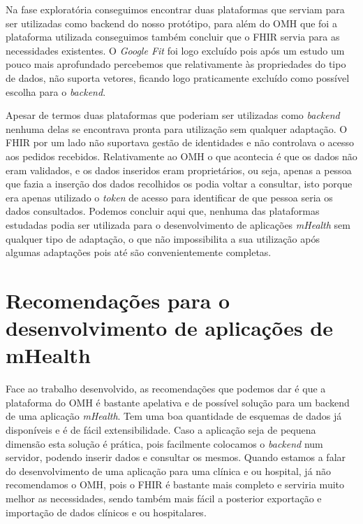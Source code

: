 Na fase exploratória conseguimos encontrar duas plataformas que serviam para ser utilizadas como backend do nosso protótipo, para além do \gls{OMH} que foi a plataforma utilizada conseguimos também concluir que o \gls{FHIR} servia para as necessidades existentes. O \textit{Google Fit} foi logo excluído pois após um estudo um pouco mais aprofundado percebemos que relativamente às propriedades do tipo de dados, não suporta vetores, ficando logo praticamente excluído como possível escolha para o \textit{backend}.\par 
Apesar de termos duas plataformas que poderiam ser utilizadas como \textit{backend} nenhuma delas se encontrava pronta para utilização sem qualquer adaptação. O \gls{FHIR} por um lado não suportava gestão de identidades e não controlava o acesso aos pedidos recebidos. Relativamente ao \gls{OMH} o que acontecia é que os dados não eram validados, e os dados inseridos eram proprietários, ou seja, apenas a pessoa que fazia a inserção dos dados recolhidos os podia voltar a consultar, isto porque era apenas utilizado o \textit{token} de acesso para identificar de que pessoa seria os dados consultados.
Podemos concluir aqui que, nenhuma das plataformas estudadas podia ser utilizada para o desenvolvimento de aplicações \textit{mHealth} sem qualquer tipo de adaptação, o que não impossibilita a sua utilização após algumas adaptações pois até são convenientemente completas.

\section{Recomendações para o desenvolvimento de aplicações de mHealth}


Face ao trabalho desenvolvido, as recomendações que podemos dar é que a plataforma do \gls{OMH} é bastante apelativa e de possível solução para um backend de uma aplicação \textit{mHealth}. Tem uma boa quantidade de esquemas de dados já disponíveis e é de fácil extensibilidade. Caso a aplicação seja de pequena dimensão esta solução é prática, pois facilmente colocamos o \textit{backend} num servidor, podendo inserir dados e consultar os mesmos. Quando estamos a falar do desenvolvimento de uma aplicação para uma clínica e ou hospital, já não recomendamos o \gls{OMH}, pois o \gls{FHIR} é bastante mais completo e serviria muito melhor as necessidades, sendo também mais fácil a posterior exportação e importação de dados clínicos e ou hospitalares.


\cleardoublepage